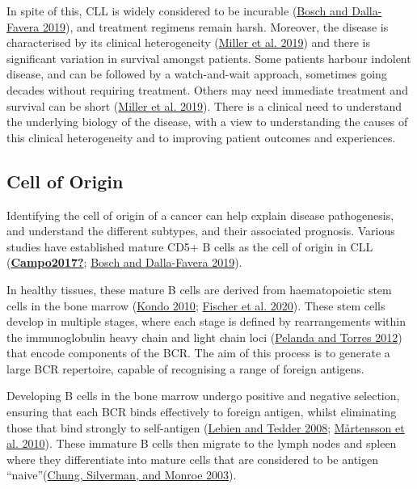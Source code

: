 \documentclass[11pt, a4paper, twosided]{book}
\begin{document}
In spite of this, CLL is widely considered to be incurable (\protect\hyperlink{ref-Bosch2019}{Bosch and Dalla-Favera 2019}), and treatment regimens remain harsh. Moreover, the disease is characterised by its clinical heterogeneity (\protect\hyperlink{ref-Miller2019}{Miller et al. 2019}) and there is significant variation in survival amongst patients. Some patients harbour indolent disease, and can be followed by a watch-and-wait approach, sometimes going decades without requiring treatment. Others may need immediate treatment and survival can be short (\protect\hyperlink{ref-Miller2019}{Miller et al. 2019}). There is a clinical need to understand the underlying biology of the disease, with a view to understanding the causes of this clinical heterogeneity and to improving patient outcomes and experiences.

\hypertarget{intro-cell-of-origin}{%
\subsection{Cell of Origin}\label{intro-cell-of-origin}}

Identifying the cell of origin of a cancer can help explain disease pathogenesis, and understand the different subtypes, and their associated prognosis. Various studies have established mature CD5+ B cells as the cell of origin in CLL (\protect\hyperlink{ref-Campo2017}{\textbf{Campo2017?}}; \protect\hyperlink{ref-Bosch2019}{Bosch and Dalla-Favera 2019}).

In healthy tissues, these mature B cells are derived from haematopoietic stem cells in the bone marrow (\protect\hyperlink{ref-Kondo2010}{Kondo 2010}; \protect\hyperlink{ref-Fischer2020}{Fischer et al. 2020}). These stem cells develop in multiple stages, where each stage is defined by rearrangements within the immunoglobulin heavy chain and light chain loci (\protect\hyperlink{ref-Pelanda2012}{Pelanda and Torres 2012}) that encode components of the BCR. The aim of this process is to generate a large BCR repertoire, capable of recognising a range of foreign antigens.

Developing B cells in the bone marrow undergo positive and negative selection, ensuring that each BCR binds effectively to foreign antigen, whilst eliminating those that bind strongly to self-antigen (\protect\hyperlink{ref-Lebien2008}{Lebien and Tedder 2008}; \protect\hyperlink{ref-Martensson2010}{Mårtensson et al. 2010}). These immature B cells then migrate to the lymph nodes and spleen where they differentiate into mature cells that are considered to be antigen ``naive''(\protect\hyperlink{ref-Chung2003}{Chung, Silverman, and Monroe 2003}).
\end{document}
